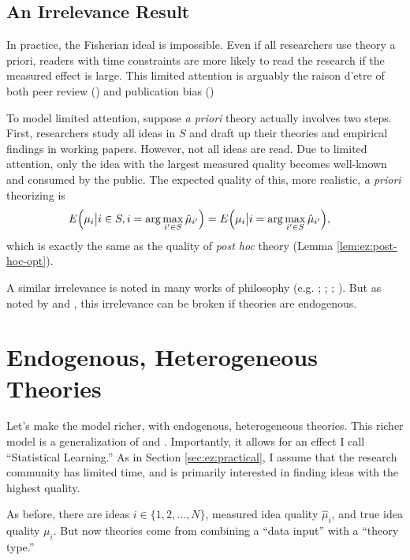 \documentclass[12pt,english]{article}
\theoremstyle{plain}
\theoremstyle{plain}
\begin{document}
\subsection{An Irrelevance Result}\label{sec:ez:irr}

In practice, the Fisherian ideal is impossible. Even if all researchers use theory a priori, readers with time constraints are more likely to read the research if the measured effect is large.  This limited attention is arguably the raison d'etre of both peer review (\citet{klamer2002attention}) and publication bias (\citet{chen2022publication})

To model limited attention, suppose \emph{a priori} theory actually involves two steps. First, researchers study all ideas in $S$ and draft up their theories and empirical findings in working papers. However, not all ideas are read.  Due to limited attention, only the idea with the largest measured quality becomes well-known and consumed by the public. The expected quality of this, more realistic, \emph{a priori} theorizing is
\begin{align}
E\Bigl(\mu_{i}\big|i\in S ,i=\arg\max_{i'\in S }\hat{\mu}_{i'}\Bigr) 
& =
E\Bigl(\mu_{i}\big|i=\arg\max_{i'\in S }\hat{\mu}_{i'}\Bigr),
\end{align}
which is exactly the same as the quality of \emph{post hoc} theory (Lemma \ref{lem:ez:post-hoc-opt}).

A similar irrelevance is noted in many works of philosophy (e.g. \citet{hempel1966philosophy}; \citet{lakatos1970methodology}; \citet{rosenkrantz1977inference}; \citet{gardner1982predicting}).  But as noted by \citet{maher1988prediction} and \citet{kahn1996positive}, this irrelevance can be broken if theories are endogenous.

\section{Endogenous, Heterogeneous Theories}\label{sec:het}

Let's make the model richer, with endogenous, heterogeneous theories. This richer model is a generalization of \citet{maher1988prediction} and \citet{kahn1996positive}. Importantly, it allows for an effect I call ``Statistical Learning.'' As in Section \ref{sec:ez:practical}, I assume that the research community has limited time, and is primarily interested in finding ideas with the highest quality.

As before, there are ideas $i\in \{1,2,...,N\}$, measured idea quality $\hat{\mu}_{i}$, and true idea quality $\mu_{i}$. But now  theories come from combining a ``data input'' with a ``theory type.''  
\end{document}

